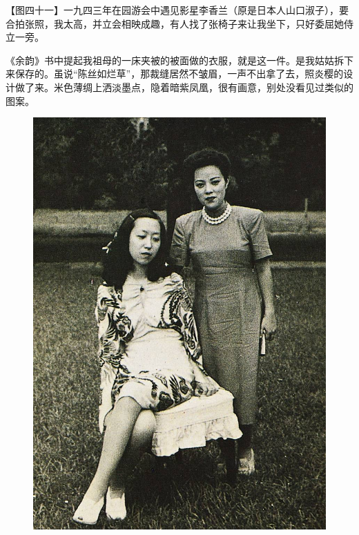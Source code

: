 \clearpage
\par 【图四十一】一九四三年在园游会中遇见影星李香兰（原是日本人山口淑子），要合拍张照，我太高，并立会相映成趣，有人找了张椅子来让我坐下，只好委屈她侍立一旁。
\par 《余韵》书中提起我祖母的一床夹被的被面做的衣服，就是这一件。是我姑姑拆下来保存的。虽说“陈丝如烂草”，那裁缝居然不皱眉，一声不出拿了去，照炎樱的设计做了来。米色薄绸上洒淡墨点，隐着暗紫凤凰，很有画意，别处没看见过类似的图案。
\begin{figure}[htb]
    \centering %
    \includegraphics[scale=0.4]{picture/对照记41.jpeg}
\end{figure}

